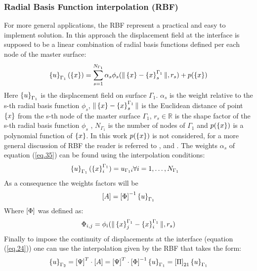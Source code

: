      \subsubsection{Radial Basis Function interpolation (RBF)}\label{sssec332}
     For more general applications, the RBF represent a practical and easy to implement solution. In this approach the displacement field at the interface  is supposed to be a linear combination of radial basis functions defined per each node of the master surface:
     \begin{equation}
     \label{eq.35}
     \left\lbrace{u}\right \rbrace_{\Gamma_1}(\left\lbrace{x}\right \rbrace)=\sum_{s=1}^{N_{\Gamma_1}}\alpha_s\phi_s(\|\left\lbrace{x}\right \rbrace-\left\lbrace{x}\right \rbrace^{\Gamma_1}_s\|,r_s)+p(\left\lbrace{x}\right \rbrace)
     \end{equation}
     Here $\left\lbrace{u}\right \rbrace_{\Gamma_1}$ is the displacement field on surface $\Gamma_1$. $\alpha_s$ is the weight relative to the s-th radial basis function $\phi_s$, $\|\left\lbrace{x}\right \rbrace-\left\lbrace{x}\right \rbrace^{\Gamma_1}_s\| $ is the Euclidean distance of point $\left\lbrace{x}\right \rbrace$ from the s-th node of the master surface $\Gamma_1$, $r_s \in \mathbb{R} $ is the shape factor of the s-th radial basis function $\phi_s$ , $N_{\Gamma_1}$ is the number of nodes of $\Gamma_1$ and $p(\left\lbrace{x}\right \rbrace)$ is a polynomial function of $\left\lbrace{x}\right \rbrace$. In this work $p(\left\lbrace{x}\right \rbrace)$ is not considered, for a more general discussion of RBF the reader is referred to \cite{de2007review} , \cite{beckert2001multivariate} and \cite{smith2000evaluation}. The weights $\alpha_s$ of equation (\ref{eq.35}) can be found using the interpolation conditions:
     \begin{eqnarray}
     \label{eq.36}
     \left\lbrace{u}\right \rbrace_{\Gamma_1}(\left\lbrace{x}\right \rbrace_i^{\Gamma_1})=u_{\Gamma_1 i} & \forall i=1,\dots,N_{\Gamma_1} 
     \end{eqnarray}
     As a consequence the weights factors will be
     \begin{equation}
     \label{eq.37}
     \left[{A}\right]=\left[{\Phi}\right]^{-1}\left\lbrace{u}\right \rbrace_{\Gamma_1}
     \end{equation}
     Where $\left[{\Phi}\right]$ was defined as:
     \begin{equation}
     \label{eq.38}
     \Phi_{i,j}=\phi_i(\|\left\lbrace{x}\right \rbrace^{\Gamma_1}_j-\left\lbrace{x}\right \rbrace^{\Gamma_1}_i\|,r_s)
     \end{equation}
     Finally to impose the continuity of displacements at the interface (equation (\ref{eq.24})) one can use the interpolation given by the RBF that takes the form:
     \begin{equation}
     \label{eq.39}
     \left\lbrace{u}\right \rbrace_{\Gamma_2}=\left[{\Psi}\right]^T\cdot\left[{A}\right]=\left[{\Psi}\right]^T\cdot\left[{\Phi}\right]^{-1}\left\lbrace{u}\right \rbrace_{\Gamma_1}=\left[{\Pi}\right]_{21}\left\lbrace{u}\right \rbrace_{\Gamma_1}
     \end{equation}
